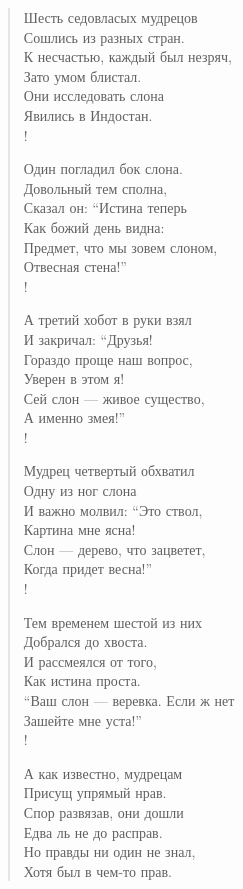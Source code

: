\documentclass[a5paper]{article}
\begin{document}
\begin{verse}
    Шесть седовласых мудрецов \\
    Сошлись из разных стран. \\
    К несчастью, каждый был незряч, \\
    Зато умом блистал. \\
    Они исследовать слона \\
    Явились в Индостан. \\!

    Один погладил бок слона. \\
    Довольный тем сполна, \\
    Сказал он: ``Истина теперь \\
    Как божий день видна: \\
    Предмет, что мы зовем слоном, ­\\
    Отвесная стена!'' \\!

    А третий хобот в руки взял \\
    И закричал: ``Друзья! \\
    Гораздо проще наш вопрос, \\
    Уверен в этом я! \\
    Сей слон --- живое существо, \\
    А именно змея!'' \\!

    Мудрец четвертый обхватил \\
    Одну из ног слона \\
    И важно молвил: ``Это ствол, \\
    Картина мне ясна! \\
    Слон --- дерево, что зацветет, \\
    Когда придет весна!'' \\!

    Тем временем шестой из них \\
    Добрался до хвоста. \\
    И рассмеялся от того, \\
    Как истина проста. \\
    ``Ваш слон --- веревка. Если ж нет \\
    Зашейте мне уста!'' \\!

    А как известно, мудрецам \\
    Присущ упрямый нрав. \\
    Спор развязав, они дошли \\
    Едва ль не до расправ. \\
    Но правды ни один не знал, \\
    Хотя был в чем-то прав.
\end{verse}
\end{document}
